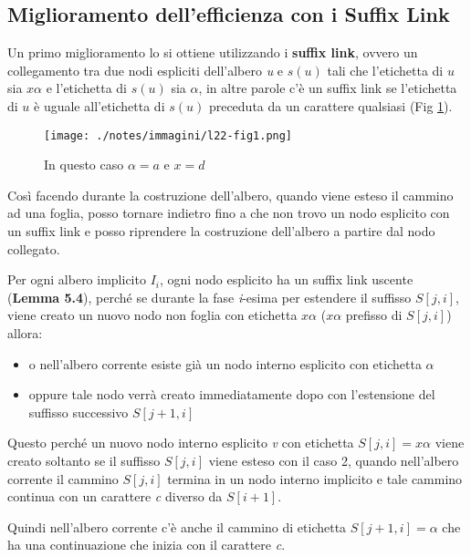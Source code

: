 

\subsection{Miglioramento dell'efficienza con i Suffix Link}

Un primo miglioramento lo si ottiene utilizzando i \textbf{suffix link}, ovvero un collegamento tra due nodi espliciti dell'albero \textit{u} e $ s(u) $ tali che l'etichetta di $ u $ sia $ x\alpha $ e l'etichetta di $ s(u) $ sia $ \alpha $, in altre parole c'è un suffix link se l'etichetta di $ u $ è uguale all'etichetta di $ s(u) $ preceduta da un carattere qualsiasi (Fig \ref{asdasdasd2}).

\begin{figure}[htbp]
	\centering
	\texttt{[image: ./notes/immagini/l22-fig1.png]}
	\caption{In questo caso $\alpha=a$ e $x=d$}\label{asdasdasd2}
\end{figure}

Così facendo durante la costruzione dell'albero, quando viene esteso il cammino ad una foglia, posso tornare indietro fino a che non trovo un nodo esplicito con un suffix link e posso riprendere la costruzione dell'albero a partire dal nodo collegato.

Per ogni albero implicito $ I_i $, ogni nodo esplicito ha un suffix link uscente (\textbf{Lemma 5.4}), perché se durante la fase \textit{i}-esima per estendere il suffisso $ S[j,i] $, viene creato un nuovo nodo non foglia con etichetta $ x\alpha $ ($x\alpha$ prefisso di $ S[j,i] $) allora:

\begin{itemize}
	\item o nell'albero corrente esiste già un nodo interno esplicito con etichetta $\alpha$
	\item oppure tale nodo verrà creato immediatamente dopo con l'estensione del suffisso successivo $ S[j+1,i] $
\end{itemize}

Questo perché un nuovo nodo interno esplicito \textit{v} con etichetta $ S[j,i] = x\alpha $ viene creato soltanto se il suffisso $ S[j,i] $ viene esteso con il caso 2, quando nell'albero corrente il cammino $ S[j,i] $ termina in un nodo interno implicito e tale cammino continua con un carattere \textit{c} diverso da $S[i+1]$.

Quindi nell'albero corrente c'è anche il cammino di etichetta $S[j+1,i] = \alpha$ che ha una continuazione che inizia con il carattere \textit{c}.


